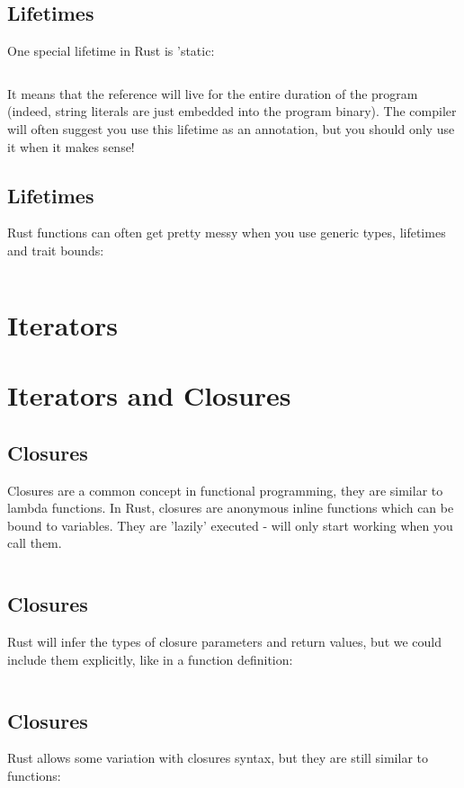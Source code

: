 \documentclass[usenames,twocolumn,dvipsnames,10pt,a4wide]{article}
\begin{document}
\subsection{Lifetimes}
	One special lifetime in Rust is 'static:
	\inputminted[fontsize=\normalsize]{rust}{code/lifetimes8.rs}
	It means that the reference will live for the entire
	duration of the program (indeed, string literals
	are just embedded into the program binary).
	The compiler will often suggest you use this
	lifetime as an annotation, but you should only
	use it when it makes sense!


\subsection{Lifetimes}
	Rust functions can often get pretty messy when you use
	generic types, lifetimes and trait bounds:
	\inputminted[fontsize=\normalsize]{rust}{code/lifetimes9.rs}


\section{Iterators}

\section{Iterators and Closures}

\subsection{Closures}
	Closures are a common concept in functional programming,
	they are similar to lambda functions. In Rust, closures
	are anonymous inline functions which can be bound to
	variables. They are 'lazily' executed - will only start
	working when you call them.

	
	\inputminted[fontsize=\normalsize]{rust}{code/closures1.rs}


\subsection{Closures}
	Rust will infer the types of closure parameters
	and return values, but we could include them
	explicitly, like in a function definition:
	
	\inputminted[fontsize=\normalsize]{rust}{code/closures2.rs}


\subsection{Closures}
	Rust allows some variation with closures syntax,
	but they are still similar to functions:
	
\end{document}
